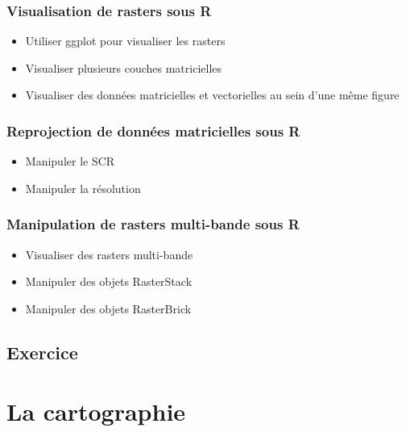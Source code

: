 \documentclass[
  12pt,
]{krantz}
\providecommand{\tightlist}{%
  \setlength{\itemsep}{0pt}\setlength{\parskip}{0pt}}
\begin{document}
\hypertarget{visualisation-de-rasters-sous-r}{%
\subsection{Visualisation de rasters sous R}\label{visualisation-de-rasters-sous-r}}

\begin{itemize}
\tightlist
\item
  Utiliser ggplot pour visualiser les rasters
\item
  Visualiser plusieurs couches matricielles
\item
  Visualiser des données matricielles et vectorielles au sein d'une même figure
\end{itemize}

\hypertarget{reprojection-de-donnuxe9es-matricielles-sous-r}{%
\subsection{Reprojection de données matricielles sous R}\label{reprojection-de-donnuxe9es-matricielles-sous-r}}

\begin{itemize}
\tightlist
\item
  Manipuler le SCR
\item
  Manipuler la résolution
\end{itemize}

\hypertarget{manipulation-de-rasters-multi-bande-sous-r}{%
\subsection{Manipulation de rasters multi-bande sous R}\label{manipulation-de-rasters-multi-bande-sous-r}}

\begin{itemize}
\tightlist
\item
  Visualiser des rasters multi-bande
\item
  Manipuler des objets RasterStack
\item
  Manipuler des objets RasterBrick
\end{itemize}

\hypertarget{exercice-3}{%
\section{Exercice}\label{exercice-3}}

\hypertarget{carto}{%
\chapter{La cartographie}\label{carto}}
\end{document}
